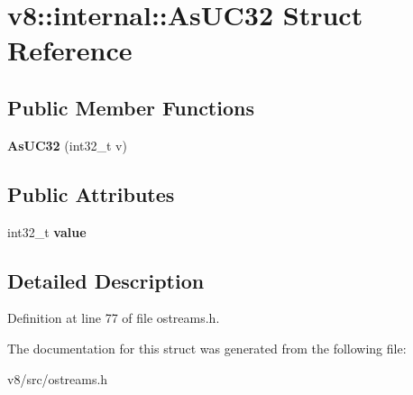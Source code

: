 \hypertarget{structv8_1_1internal_1_1AsUC32}{}\section{v8\+:\+:internal\+:\+:As\+U\+C32 Struct Reference}
\label{structv8_1_1internal_1_1AsUC32}
\subsection*{Public Member Functions}
\begin{DoxyCompactItemize}
\item 
\mbox{\label{structv8_1_1internal_1_1AsUC32_a55d751a53e563cf5c80f7e9f65c784bc}} 
{\bfseries As\+U\+C32} (int32\+\_\+t v)
\end{DoxyCompactItemize}
\subsection*{Public Attributes}
\begin{DoxyCompactItemize}
\item 
\mbox{\label{structv8_1_1internal_1_1AsUC32_a88d3f2de1bdd0a8b848e2f0a9f0557df}} 
int32\+\_\+t {\bfseries value}
\end{DoxyCompactItemize}


\subsection{Detailed Description}


Definition at line 77 of file ostreams.\+h.



The documentation for this struct was generated from the following file\+:\begin{DoxyCompactItemize}
\item 
v8/src/ostreams.\+h\end{DoxyCompactItemize}
